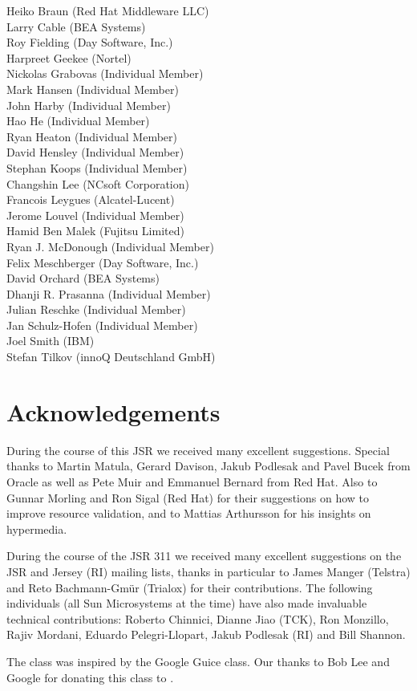 Heiko Braun (Red Hat Middleware LLC) \\
Larry Cable (BEA Systems) \\
Roy Fielding (Day Software, Inc.) \\
Harpreet Geekee (Nortel) \\
Nickolas Grabovas (Individual Member) \\
Mark Hansen (Individual Member) \\
John Harby (Individual Member) \\
Hao He (Individual Member) \\
Ryan Heaton (Individual Member) \\
David Hensley (Individual Member) \\
Stephan Koops (Individual Member) \\
Changshin Lee (NCsoft Corporation) \\
Francois Leygues (Alcatel-Lucent) \\
Jerome Louvel (Individual Member) \\
Hamid Ben Malek (Fujitsu Limited) \\
Ryan J. McDonough (Individual Member) \\
Felix Meschberger (Day Software, Inc.) \\
David Orchard (BEA Systems) \\
Dhanji R. Prasanna (Individual Member) \\
Julian Reschke (Individual Member) \\
Jan Schulz-Hofen (Individual Member) \\
Joel Smith (IBM) \\
Stefan Tilkov (innoQ Deutschland GmbH)

\section{Acknowledgements}
\label{acks}

During the course of this JSR we received many excellent suggestions. Special thanks to Martin Matula, Gerard Davison, Jakub Podlesak and Pavel Bucek from Oracle as well as Pete Muir and Emmanuel Bernard from Red Hat. Also to Gunnar Morling and Ron Sigal (Red Hat) for their suggestions on how to improve resource validation, and to Mattias Arthursson for his insights on hypermedia.

During the course of the JSR 311 we received many excellent suggestions on the JSR and Jersey (RI) mailing lists, thanks in particular to James Manger (Telstra) and Reto Bachmann-Gm\"{u}r (Trialox) for their contributions. The following individuals (all Sun Microsystems at the time) have also made invaluable technical contributions: Roberto Chinnici, Dianne Jiao (TCK), Ron Monzillo, Rajiv Mordani, Eduardo Pelegri-Llopart, Jakub Podlesak (RI) and Bill Shannon. 

The  class was inspired by the Google Guice  class. Our thanks to Bob Lee and Google for donating this class to \jaxrs. 
